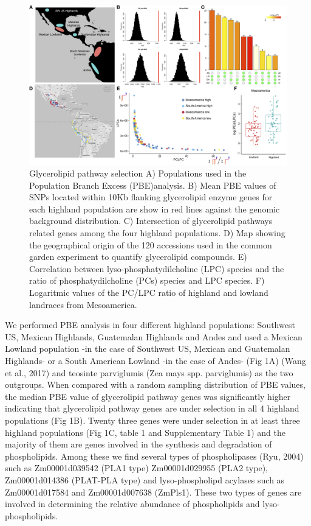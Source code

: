 \documentclass[9pt,twocolumn,twoside,lineno]{gsajnl}
\begin{document}
\begin{figure}[!ht]
\begin{center}
\includegraphics[width=0.8\paperwidth]{Figures/Fig_1.png}
\caption{Glycerolipid pathway selection 
A) Populations used in the Population Branch Excess (PBE)analysis. 
B) Mean PBE values of SNPs located within 10Kb flanking glycerolipid enzyme genes for each highland population are show in red lines against the genomic background distribution. 
C) Intersection of glycerolipid pathways related genes among the four highland populations. 
D) Map showing the geographical origin of the 120 accessions used in the common garden experiment to quantify glycerolipid compounds. 
E) Correlation between  lyso-phosphatydilcholine (LPC) species and the ratio of  phosphatydilcholine (PCs) species and LPC species. 
F) Logaritmic values of the PC/LPC ratio of highland and lowland landraces from Mesoamerica.}
\label{PBE_Qst-Fst}
\end{center}
\end{figure} 

We performed PBE analysis in four different highland populations: Southwest US, Mexican Highlands, Guatemalan Highlands and Andes and used a Mexican Lowland population -in the case of Southwest US, Mexican and Guatemalan Highlands- or a South American Lowland -in the case of Andes- (Fig 1A) (Wang et al., 2017) and teosinte parviglumis (Zea mays spp. parviglumis) as the two outgroups. 
When compared with a random sampling distribution of PBE values, the median PBE value of glycerolipid pathway genes was significantly higher indicating that glycerolipid pathway genes are under selection in all 4 highland populations (Fig 1B). 
Twenty three genes were under selection in at least three highland populations (Fig 1C, table 1 and Supplementary Table 1) and the majority of them are genes involved in the synthesis and degradation of phospholipids. 
Among these we find several types of phospholipases (Ryu, 2004) such as Zm00001d039542 (PLA1 type) Zm00001d029955 (PLA2 type), Zm00001d014386 (PLAT-PLA type) and lyso-phospholipd acylases such as Zm00001d017584 and Zm00001d007638 (ZmPls1).  
These two types of genes are involved in determining the relative abundance of phospholipids and lyso-phospholipids. 
\end{document}
